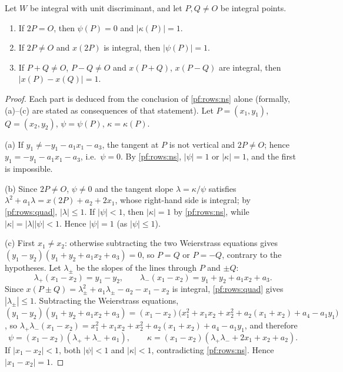 \begin{lemma}\label{pf:rows:unitpts}
Let $W$ be integral with unit discriminant, and let $P,Q\ne O$ be integral points.
\begin{enumerate}[label=(\alph*)]
\item If $2P=O$, then $\psi(P)=0$ and $|\kappa(P)|=1$.
\item If $2P\ne O$ and $x(2P)$ is integral, then $|\psi(P)|=1$.
\item If $P+Q\ne O$, $P-Q\ne O$ and $x(P+Q)$, $x(P-Q)$ are integral, then $|x(P)-x(Q)|=1$.
\end{enumerate}
\end{lemma}

\begin{proof}
Each part is deduced from the conclusion of \cref{pf:rows:ns} alone (formally, (a)--(c) are stated as consequences of
that statement). Let $P=(x_1,y_1)$, $Q=(x_2,y_2)$, $\psi=\psi(P)$, $\kappa=\kappa(P)$.

(a) If $y_1\ne-y_1-a_1x_1-a_3$, the tangent at $P$ is not vertical and $2P\ne O$; hence $y_1=-y_1-a_1x_1-a_3$, i.e.\
$\psi=0$. By \cref{pf:rows:ns}, $|\psi|=1$ or $|\kappa|=1$, and the first is impossible.

(b) Since $2P\ne O$, $\psi\ne0$ and the tangent slope $\lambda=\kappa/\psi$ satisfies
$\lambda^2+a_1\lambda=x(2P)+a_2+2x_1$, whose right-hand side is integral; by \cref{pf:rows:quad}, $|\lambda|\le1$. If
$|\psi|<1$, then $|\kappa|=1$ by \cref{pf:rows:ns}, while $|\kappa|=|\lambda||\psi|<1$. Hence $|\psi|=1$ (as $|\psi|\le1$).

(c) First $x_1\ne x_2$: otherwise subtracting the two Weierstrass equations gives $(y_1-y_2)(y_1+y_2+a_1x_2+a_3)=0$, so
$P=Q$ or $P=-Q$, contrary to the hypotheses. Let $\lambda_\pm$ be the slopes of the lines through $P$ and $\pm Q$:
\[
\lambda_+(x_1-x_2)=y_1-y_2,\qquad \lambda_-(x_1-x_2)=y_1+y_2+a_1x_2+a_3 .
\]
Since $x(P\pm Q)=\lambda_\pm^2+a_1\lambda_\pm-a_2-x_1-x_2$ is integral, \cref{pf:rows:quad} gives $|\lambda_\pm|\le1$.
Subtracting the Weierstrass equations,
$(y_1-y_2)(y_1+y_2+a_1x_2+a_3)=(x_1-x_2)\bigl(x_1^2+x_1x_2+x_2^2+a_2(x_1+x_2)+a_4-a_1y_1\bigr)$, so
$\lambda_+\lambda_-(x_1-x_2)=x_1^2+x_1x_2+x_2^2+a_2(x_1+x_2)+a_4-a_1y_1$, and therefore
\[
\psi=(x_1-x_2)(\lambda_++\lambda_-+a_1),\qquad \kappa=(x_1-x_2)(\lambda_+\lambda_-+2x_1+x_2+a_2).
\]
If $|x_1-x_2|<1$, both $|\psi|<1$ and $|\kappa|<1$, contradicting \cref{pf:rows:ns}. Hence $|x_1-x_2|=1$.
\end{proof}

